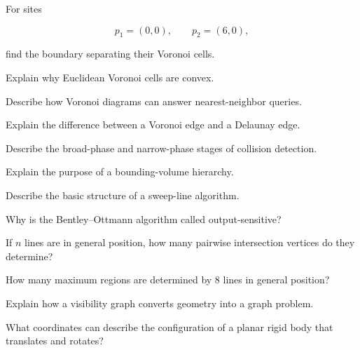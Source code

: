 \begin{exercise}[2]
For sites

\[
p_1=(0,0),
\qquad
p_2=(6,0),
\]

find the boundary separating their Voronoi cells.
\end{exercise}

\begin{exercise}[2]
Explain why Euclidean Voronoi cells are convex.
\end{exercise}

\begin{exercise}[2]
Describe how Voronoi diagrams can answer nearest-neighbor queries.
\end{exercise}

\begin{exercise}[2]
Explain the difference between a Voronoi edge and a Delaunay edge.
\end{exercise}

\begin{exercise}[2]
Describe the broad-phase and narrow-phase stages of collision detection.
\end{exercise}

\begin{exercise}[2]
Explain the purpose of a bounding-volume hierarchy.
\end{exercise}

\begin{exercise}[2]
Describe the basic structure of a sweep-line algorithm.
\end{exercise}

\begin{exercise}[2]
Why is the Bentley--Ottmann algorithm called output-sensitive?
\end{exercise}

\begin{exercise}[2]
If \(n\) lines are in general position, how many pairwise intersection
vertices do they determine?
\end{exercise}

\begin{exercise}[2]
How many maximum regions are determined by \(8\) lines in general position?
\end{exercise}

\begin{exercise}[2]
Explain how a visibility graph converts geometry into a graph problem.
\end{exercise}

\begin{exercise}[2]
What coordinates can describe the configuration of a planar rigid body that
translates and rotates?
\end{exercise}


